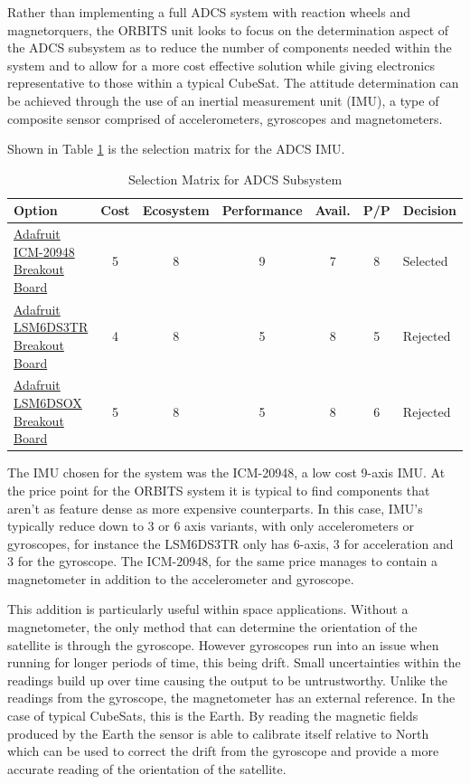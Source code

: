 \documentclass[a4paper,12pt,titlepage]{report}
\begin{document}
Rather than implementing a full ADCS system with reaction wheels and magnetorquers, the ORBITS unit looks to focus on the determination aspect of the ADCS subsystem as to reduce the number of components needed within the system and to allow for a more cost effective solution while giving electronics representative to those within a typical CubeSat. The attitude determination can be achieved through the use of an inertial measurement unit (IMU), a type of composite sensor comprised of accelerometers, gyroscopes and magnetometers.

Shown in Table \ref{tab:ADCS-selection-matrix} is the selection matrix for the ADCS IMU.

\begin{table}[h]
    \centering
    \caption{Selection Matrix for ADCS Subsystem}
    \label{tab:ADCS-selection-matrix}
    \begin{tabular}{|p{3cm}|c|c|c|c|c|p{2.5cm}|}
    \hline
    \textbf{Option} & \textbf{Cost} & \textbf{Ecosystem} & \textbf{Performance} & \textbf{Avail.} & \textbf{P/P} & \textbf{Decision} \\ \hline
    \href{https://www.digikey.co.uk/en/products/detail/adafruit-industries-llc/4554/17039173}{Adafruit ICM-20948 Breakout Board}& 5 & 8 & 9 & 7 & 8 & Selected \\\hline
    \href{https://thepihut.com/products/adafruit-lsm6ds3tr-c-6-dof-accel-gyro-imu-stemma-qt-qwiic}{Adafruit LSM6DS3TR Breakout Board}& 4 & 8 & 5 & 8 & 5 & Rejected \\\hline
    \href{https://thepihut.com/products/adafruit-lsm6ds3tr-c-6-dof-accel-gyro-imu-stemma-qt-qwiic}{Adafruit LSM6DSOX Breakout Board}& 5 & 8 & 5 & 8 & 6 & Rejected \\\hline
    \end{tabular}
\end{table}

The IMU chosen for the system was the ICM-20948, a low cost 9-axis IMU. At the price point for the ORBITS system it is typical to find components that aren't as feature dense as more expensive counterparts. In this case, IMU's typically reduce down to 3 or 6 axis variants, with only accelerometers or gyroscopes, for instance the LSM6DS3TR only has 6-axis, 3 for acceleration and 3 for the gyroscope. The ICM-20948, for the same price manages to contain a magnetometer in addition to the accelerometer and gyroscope.

This addition is particularly useful within space applications. Without a magnetometer, the only method that can determine the orientation of the satellite is through the gyroscope. However gyroscopes run into an issue when running for longer periods of time, this being drift. Small uncertainties within the readings build up over time causing the output to be untrustworthy. Unlike the readings from the gyroscope, the magnetometer has an external reference. In the case of typical CubeSats, this is the Earth. By reading the magnetic fields produced by the Earth the sensor is able to calibrate itself relative to North which can be used to correct the drift from the gyroscope and provide a more accurate reading of the orientation of the satellite. 
\end{document}
